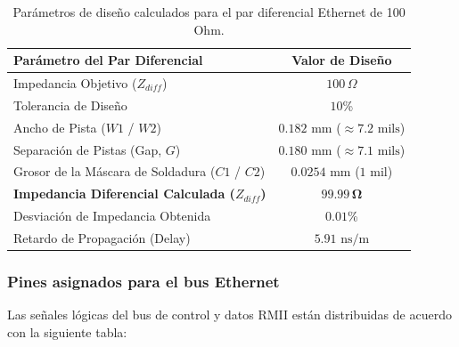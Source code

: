\documentclass[12pt,a4paper]{article}
\begin{document}
\begin{table}[H]
\centering
\small
\begin{tabular}{|l|c|}
\hline
\textbf{Parámetro del Par Diferencial} & \textbf{Valor de Diseño} \\ \hline
Impedancia Objetivo ($Z_{diff}$) & $100\,\Omega$ \\ \hline
Tolerancia de Diseño & $10$\% \\ \hline
Ancho de Pista ($W1$ / $W2$) & $0.182\text{ mm}$ ($\approx 7.2\text{ mils}$) \\ \hline
Separación de Pistas (Gap, $G$) & $0.180\text{ mm}$ ($\approx 7.1\text{ mils}$) \\ \hline
Grosor de la Máscara de Soldadura ($C1$ / $C2$) & $0.0254\text{ mm}$ ($1\text{ mil}$) \\ \hline
\textbf{Impedancia Diferencial Calculada ($Z_{diff}$)} & $\mathbf{99.99\,\Omega}$ \\ \hline
Desviación de Impedancia Obtenida & $0.01$\% \\ \hline
Retardo de Propagación (Delay) & $5.91\text{ ns/m}$ \\ \hline
\end{tabular}
\caption{Parámetros de diseño calculados para el par diferencial Ethernet de 100 Ohm.}
\label{tab:ethernet_diffpair_params}
\end{table}

\subsubsection{Pines asignados para el bus Ethernet}

Las señales lógicas del bus de control y datos RMII están distribuidas de acuerdo con la siguiente tabla:
\end{document}
